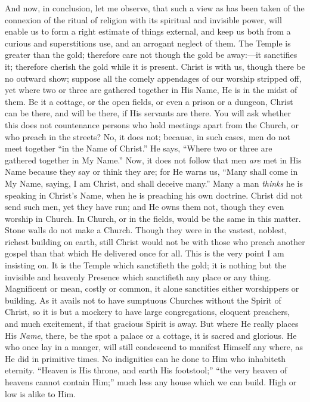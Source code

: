 And now, in conclusion, let me observe, that such a view as has
been taken of the connexion of the ritual of religion with its
spiritual and invisible power, will enable us to form a right estimate
of things external, and keep us both from a curious and superstitions
use, and an arrogant neglect of them. The Temple is greater than the
gold; therefore care not though the gold be away:—it sanctifies it;
therefore cherish the gold while it is present. Christ is with us,
though there be no outward show; suppose all the comely appendages of
our worship stripped off, yet where two or three are gathered together
in His Name, He is in the midst of them. Be it a cottage, or the open
fields, or even a prison or a dungeon, Christ can be there, and will
be there, if His servants are there. You will ask whether this does
not countenance persons who hold meetings apart from the Church, or
who preach in the streets? No, it does not; because, in such cases,
men do not meet together ``in the Name of Christ.'' He says,
``Where two or three are gathered together in My Name.'' Now,
it does not follow that men \emph{are} met in His Name because they say or
think they are; for He warns us, ``Many shall come in My Name,
saying, I am Christ, and shall deceive many.'' Many a man \emph{thinks}
he is speaking in Christ's Name, when he is preaching his own
doctrine. Christ did not send such men, yet they have run; and He owns
them not, though they even worship in Church. In Church, or in the
fields, would be the same in this matter. Stone walls do not make a
Church. Though they were in the vastest, noblest, richest building on
earth, still Christ would not be with those who preach another gospel
than that which He delivered once for all. This is the very point I am
insisting on. It is the Temple which sanctifieth the gold; it is
nothing but the invisible and heavenly Presence which sanctifieth any
place or any thing. Magnificent or mean, costly or common, it alone
sanctities either worshippers or building. As it avails not to have
sumptuous Churches without the Spirit of Christ, so it is but a
mockery to have large congregations, eloquent preachers, and much
excitement, if that gracious Spirit is away. But where He really
places His \emph{Name}, there, be the spot a palace or a cottage, it
is sacred and glorious. He who once lay in a manger, will still
condescend to manifest Himself any where, as He did in primitive
times. No indignities can he done to Him who inhabiteth eternity.
``Heaven is His throne, and earth His footstool;'' ``the
very heaven of heavens cannot contain Him;'' much less any house
which we can build. High or low is alike to Him.

